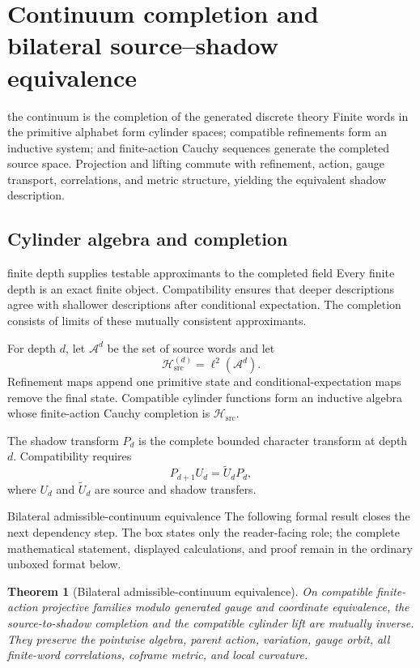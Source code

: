 \documentclass[11pt]{article}
\numberwithin{equation}{section}
\newtheorem{theorem}[definition]{Theorem}
\theoremstyle{remark}
\newcommand{\Hsrc}{\mathcal H_{\mathrm{src}}}
\begin{document}
\section{Continuum completion and bilateral source--shadow equivalence}
\begin{conceptledger}{the continuum is the completion of the generated discrete theory}
Finite words in the primitive alphabet form cylinder spaces; compatible refinements form an inductive system; and finite-action Cauchy sequences generate the completed source space. Projection and lifting commute with refinement, action, gauge transport, correlations, and metric structure, yielding the equivalent shadow description.
\end{conceptledger}

\label{sec:continuum}

\subsection{Cylinder algebra and completion}
\begin{interpretivebridge}{finite depth supplies testable approximants to the completed field}
Every finite depth is an exact finite object. Compatibility ensures that deeper descriptions agree with shallower descriptions after conditional expectation. The completion consists of limits of these mutually consistent approximants.
\end{interpretivebridge}

For depth $d$, let $\mathcal A^d$ be the set of source words and let
\begin{equation}
\Hsrc^{(d)}=\ell^2(\mathcal A^d).
\end{equation}
Refinement maps append one primitive state and conditional-expectation maps remove the final state. Compatible cylinder functions form an inductive algebra whose finite-action Cauchy completion is $\Hsrc$.

The shadow transform $P_d$ is the complete bounded character transform at depth $d$. Compatibility requires
\begin{equation}
P_{d+1}U_d=\widetilde U_dP_d,
\end{equation}
where $U_d$ and $\widetilde U_d$ are source and shadow transfers.

\begin{proofguide}{Bilateral admissible-continuum equivalence}
The following formal result closes the next dependency step. The box states only the reader-facing role; the complete mathematical statement, displayed calculations, and proof remain in the ordinary unboxed format below.
\end{proofguide}
\begin{theorem}[Bilateral admissible-continuum equivalence]
On compatible finite-action projective families modulo generated gauge and coordinate equivalence, the source-to-shadow completion and the compatible cylinder lift are mutually inverse. They preserve the pointwise algebra, parent action, variation, gauge orbit, all finite-word correlations, coframe metric, and local curvature.
\end{theorem}
\end{document}
